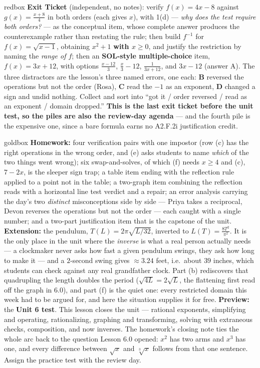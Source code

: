 \documentclass[10pt]{article}
\begin{document}
\begin{skillbox}{redbox}
\textbf{Exit Ticket} (independent, no notes): verify $f(x)=4x-8$ against $g(x)=\frac{x+8}{4}$ in both
orders (each gives $x$), with 1(d) --- \emph{why does the test require both orders?} --- as the
conceptual item, whose complete answer produces the counterexample rather than restating the rule;
then build $f^{-1}$ for $f(x)=\sqrt{x-1}$, obtaining $x^{2}+1$ \textbf{with $x\ge0$}, and justify
the restriction by naming the \emph{range of $f$}; then an \textbf{SOL-style multiple-choice} item,
$f(x)=3x+12$, with options $\frac{x-12}{3}$, $\frac{x}{3}-12$, $\frac{1}{3x+12}$, and $3x-12$
(answer A). The three distractors are the lesson's three named errors, one each: \textbf{B} reversed
the operations but not the order (Rosa), \textbf{C} read the $-1$ as an exponent, \textbf{D} changed
a sign and undid nothing. Collect and sort into ``got it / order reversed / read as an exponent /
domain dropped.'' \textbf{This is the last exit ticket before the unit test, so the piles are also
the review-day agenda} --- and the fourth pile is the expensive one, since a bare formula earns no
A2.F.2i justification credit.
\end{skillbox}

\begin{skillbox}{goldbox}
\textbf{Homework:} four verification pairs with one impostor (row (c) has the right operations in the
wrong order, and (e) asks students to name \emph{which} of the two things went wrong); six
swap-and-solves, of which (f) needs $x\ge4$ and (c), $7-2x$, is the sleeper sign trap; a table item
ending with the reflection rule applied to a point not in the table; a two-graph item combining the
reflection reads with a horizontal line test verdict and a repair; an error analysis carrying the
day's two \emph{distinct} misconceptions side by side --- Priya takes a reciprocal, Devon reverses
the operations but not the order --- each caught with a single number; and a two-part justification
item that is the capstone of the unit. \textbf{Extension:} the pendulum, $T(L)=2\pi\sqrt{L/32}$,
inverted to $L(T)=\frac{8T^{2}}{\pi^{2}}$. It is the only place in the unit where the \emph{inverse}
is what a real person actually needs --- a clockmaker never asks how fast a given pendulum swings,
they ask how long to make it --- and a $2$-second swing gives $\approx3.24$ feet, i.e.\ about $39$
inches, which students can check against any real grandfather clock. Part (b) rediscovers that
quadrupling the length doubles the period ($\sqrt{4L}=2\sqrt{L}$, the flattening first read off the
graph in 6.0), and part (f) is the quiet one: every restricted domain this week had to be argued
for, and here the situation supplies it for free.
\textbf{Preview:} the \textbf{Unit 6 test}. This lesson closes the unit --- rational exponents,
simplifying and operating, rationalizing, graphing and transforming, solving with extraneous checks,
composition, and now inverses. The homework's closing note ties the whole arc back to the question
Lesson 6.0 opened: $x^{2}$ has two arms and $x^{3}$ has one, and every difference between $\sqrt{x}$
and $\sqrt[3]{x}$ follows from that one sentence. Assign the practice test with the review day.
\end{skillbox}
\end{document}
